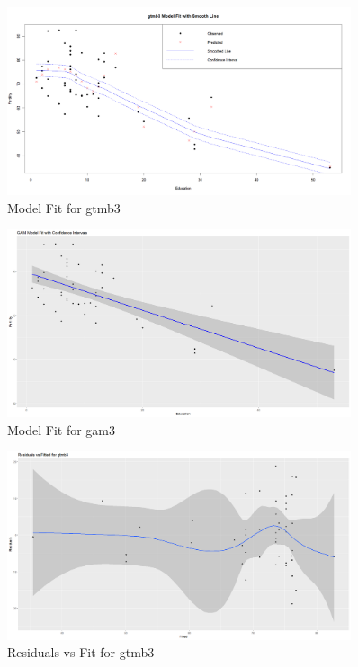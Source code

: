 \begin{figure}[h]
    \centering
    \includegraphics[width=0.9\textwidth]{visuals/model_fit_gtmb3.png}
    \caption{Model Fit for gtmb3}
    \label{fig:modelfitgtmb3}
\end{figure}

\begin{figure}[h]
    \centering
    \includegraphics[width=0.9\textwidth]{visuals/model_fit_gam3.png}
    \caption{Model Fit for gam3}
    \label{fig:modelfitgam3}
\end{figure}

\begin{figure}[h]
    \centering
    \includegraphics[width=0.9\textwidth]{visuals/resvsfit_gtmb3.png}
    \caption{Residuals vs Fit for gtmb3}
    \label{fig:resvsfitgtmb3}
\end{figure}

